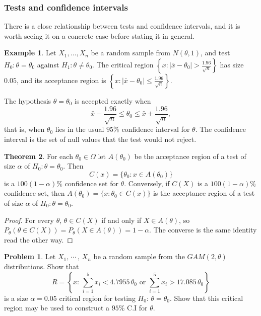 \documentclass[12pt,a4paper]{report}
\theoremstyle{definition}
\newtheorem{thm}{Theorem}[section]
\newtheorem{exa}[thm]{Example}
\newtheorem{problemx}{Problem}[section]
\newenvironment{problem}{\begin{problemx}}{\end{problemx}}
\begin{document}
\subsubsection{Tests and confidence intervals}

There is a close relationship between tests and confidence intervals, and it is
worth seeing it on a concrete case before stating it in general.

\begin{exa}
\label{ex:testci}
Let $X_1, \dots, X_n$ be a random sample from $N(\theta, 1)$, and test
$H_0\colon\theta = \theta_0$ against $H_1\colon\theta\ne\theta_0$. The critical region
$\left\{x : |\bar x - \theta_0|>\frac{1.96}{\sqrt n}\right\}$ has size $0.05$, and its acceptance
region is $\left\{x : |\bar x - \theta_0|\le\frac{1.96}{\sqrt n}\right\}$.
\end{exa}

The hypothesis $\theta = \theta_0$ is accepted exactly when
\[\bar x - \frac{1.96}{\sqrt n}\le\theta_0\le\bar x + \frac{1.96}{\sqrt n},\]
that is, when $\theta_0$ lies in the usual $95\%$ confidence interval for $\theta$. The
confidence interval is the set of null values that the test would not reject.

\begin{thm}
\label{thm:inversion}
For each $\theta_0\in\Omega$ let $A(\theta_0)$ be the acceptance region of a test of size
$\alpha$ of $H_0\colon\theta = \theta_0$. Then
\[C(x) = \{\theta_0 : x\in A(\theta_0)\}\]
is a $100(1 - \alpha)\%$ confidence set for $\theta$. Conversely, if $C(X)$ is a
$100(1 - \alpha)\%$ confidence set, then $A(\theta_0) = \{x : \theta_0\in C(x)\}$ is the
acceptance region of a test of size $\alpha$ of $H_0\colon\theta = \theta_0$.
\end{thm}

\begin{proof}
For every $\theta$, $\theta\in C(X)$ if and only if $X\in A(\theta)$, so
$P_\theta\left(\theta\in C(X)\right) = P_\theta\left(X\in A(\theta)\right) = 1 - \alpha$. The converse is the
same identity read the other way.
\end{proof}

\begin{problem}
Let $X_1, \, \cdots\,, \, X_n$ be a random sample from the $GAM(2, \theta)$ distributions. Show that
\[R = \left\{x:\, \sum^5_{i = 1}x_i  < 4.7955\, \theta_0\, \, \text{or}\,\, \sum^5_{i = 1} x_i > 17.085\, \theta_0\right\}\]
is a size $\alpha = 0.05$ critical region for testing $H_0:\, \theta = \theta_0$. Show that this critical region may be used to construct a $95\%$ C.I for $\theta$. 
\end{problem}
\end{document}
